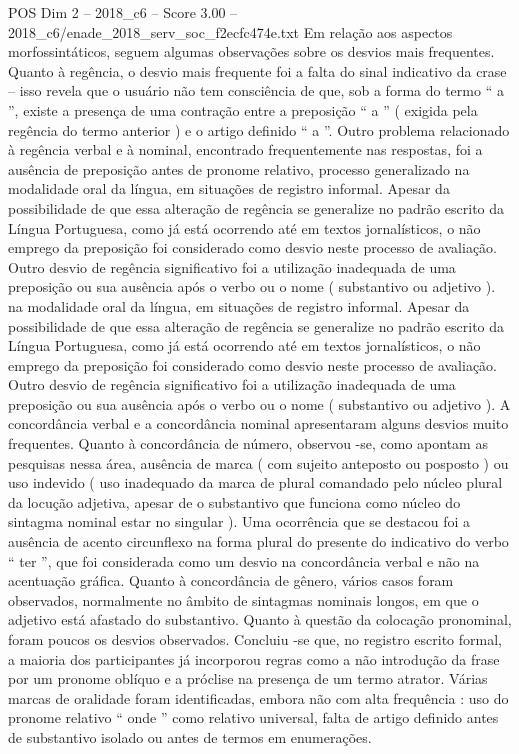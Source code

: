 \begin{textsample}{POS Dim 2 – 2018\_c6 – Score 3.00 – 2018\_c6/enade\_2018\_serv\_soc\_f2ecfc474e.txt}
Em relação aos aspectos morfossintáticos, seguem algumas observações sobre os desvios mais frequentes.
Quanto à regência, o desvio mais frequente foi a falta do sinal indicativo da crase – isso revela que o usuário não tem consciência de que, sob a forma do termo “ a ”, existe a presença de uma contração entre a preposição “ a ” ( exigida pela regência do termo anterior ) e o artigo definido “ a ”.
Outro problema relacionado à regência verbal e à nominal, encontrado frequentemente nas respostas, foi a ausência de preposição antes de pronome relativo, processo generalizado na modalidade oral da língua, em situações de registro informal.
Apesar da possibilidade de que essa alteração de regência se generalize no padrão escrito da Língua Portuguesa, como já está ocorrendo até em textos jornalísticos, o não emprego da preposição foi considerado como desvio neste processo de avaliação.
Outro desvio de regência significativo foi a utilização inadequada de uma preposição ou sua ausência após o verbo ou o nome ( substantivo ou adjetivo ). na modalidade oral da língua, em situações de registro informal.
Apesar da possibilidade de que essa alteração de regência se generalize no padrão escrito da Língua Portuguesa, como já está ocorrendo até em textos jornalísticos, o não emprego da preposição foi considerado como desvio neste processo de avaliação.
Outro desvio de regência significativo foi a utilização inadequada de uma preposição ou sua ausência após o verbo ou o nome ( substantivo ou adjetivo ).
A concordância verbal e a concordância nominal apresentaram alguns desvios muito frequentes.
Quanto à concordância de número, observou -se, como apontam as pesquisas nessa área, ausência de marca ( com sujeito anteposto ou posposto ) ou uso indevido ( uso inadequado da marca de plural comandado pelo núcleo plural da locução adjetiva, apesar de o substantivo que funciona como núcleo do sintagma nominal estar no singular ).
Uma ocorrência que se destacou foi a ausência de acento circunflexo na forma plural do presente do indicativo do verbo “ ter ”, que foi considerada como um desvio na concordância verbal e não na acentuação gráfica.
Quanto à concordância de gênero, vários casos foram observados, normalmente no âmbito de sintagmas nominais longos, em que o adjetivo está afastado do substantivo.
Quanto à questão da colocação pronominal, foram poucos os desvios observados.
Concluiu -se que, no registro escrito formal, a maioria dos participantes já incorporou regras como a não introdução da frase por um pronome oblíquo e a próclise na presença de um termo atrator.
Várias marcas de oralidade foram identificadas, embora não com alta frequência : uso do pronome relativo “ onde ” como relativo universal, falta de artigo definido antes de substantivo isolado ou antes de termos em enumerações.

\end{textsample}
